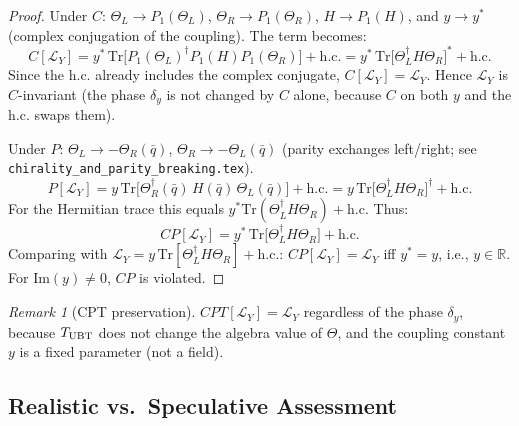 \documentclass[12pt,a4paper]{article}
\theoremstyle{definition}
\theoremstyle{remark}
\newtheorem{remark}[theorem]{Remark}
\begin{document}
\begin{proof}
Under $C$: $\Theta_L\to P_1(\Theta_L)$, $\Theta_R\to P_1(\Theta_R)$, $H\to P_1(H)$,
and $y\to y^*$ (complex conjugation of the coupling).
The term becomes:
\begin{equation}
  C[\mathcal{L}_Y]
  = y^*\,\mathrm{Tr}\bigl[P_1(\Theta_L)^\dagger P_1(H) P_1(\Theta_R)\bigr]
  + \mathrm{h.c.}
  = y^*\,\mathrm{Tr}\bigl[\Theta_L^\dagger H \Theta_R\bigr]^*
  + \mathrm{h.c.}
\end{equation}
Since the $\mathrm{h.c.}$ already includes the complex conjugate, $C[\mathcal{L}_Y]=\mathcal{L}_Y$.
Hence $\mathcal{L}_Y$ is $C$-invariant (the phase $\delta_y$ is not changed
by $C$ alone, because $C$ on both $y$ and the $\mathrm{h.c.}$ swaps them).

Under $P$: $\Theta_L\to -\Theta_R(\bar q)$, $\Theta_R\to -\Theta_L(\bar q)$
(parity exchanges left/right; see \texttt{chirality\_and\_parity\_breaking.tex}).
\begin{equation}
  P[\mathcal{L}_Y]
  = y\,\mathrm{Tr}\bigl[\Theta_R^\dagger(\bar q)\, H(\bar q)\, \Theta_L(\bar q)\bigr]
  + \mathrm{h.c.}
  = y\,\mathrm{Tr}\bigl[\Theta_L^\dagger H \Theta_R\bigr]^{\dagger} + \mathrm{h.c.}
\end{equation}
For the Hermitian trace this equals $y^*\mathrm{Tr}(\Theta_L^\dagger H\Theta_R) + \mathrm{h.c.}$
Thus:
\begin{equation}
  CP[\mathcal{L}_Y]
  = y^*\,\mathrm{Tr}\bigl[\Theta_L^\dagger H \Theta_R\bigr] + \mathrm{h.c.}
  \label{eq:cp:yukawa_CP}
\end{equation}
Comparing with $\mathcal{L}_Y = y\,\mathrm{Tr}[\Theta_L^\dagger H\Theta_R]+\mathrm{h.c.}$:
$CP[\mathcal{L}_Y]=\mathcal{L}_Y$ iff $y^* = y$, i.e., $y\in\mathbb{R}$.
For $\mathrm{Im}(y)\neq0$, $CP$ is violated.
\end{proof}

\begin{remark}[CPT preservation]
$CPT[\mathcal{L}_Y] = \mathcal{L}_Y$ regardless of the phase $\delta_y$,
because $T_{\rm UBT}$ does not change the algebra value of $\Theta$,
and the coupling constant $y$ is a fixed parameter (not a field).
\end{remark}

\subsection{Realistic vs.\ Speculative Assessment}
\end{document}
